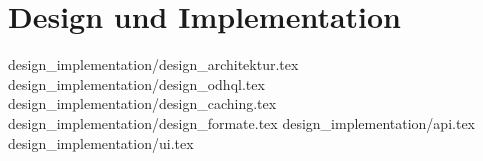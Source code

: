 \chapter{Design und Implementation}
{design_implementation/design_architektur.tex}
{design_implementation/design_odhql.tex}
{design_implementation/design_caching.tex}
{design_implementation/design_formate.tex}
{design_implementation/api.tex}
{design_implementation/ui.tex}







